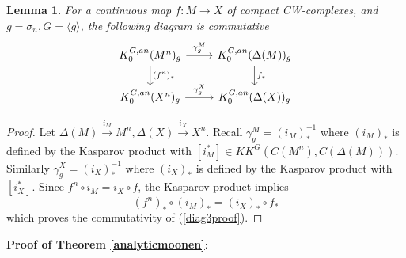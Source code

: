 \documentclass[11pt,leqno,twoside]{amsart}
\theoremstyle{plainsl}
\newtheorem{lemma}[theorem]{Lemma}
\theoremstyle{definition}
\begin{document}
\begin{lemma}\label{functoriallocalization} 
    For a continuous map $f:M\rightarrow X$  of compact CW-complexes, and $g=\sigma_n , G=\langle g\rangle$, the following diagram is commutative
\begin{equation}\label{diag3proof}
    \begin{tikzcd}
     K^{G,an}_0(M^n)_{g}  \arrow[r,  "\gamma^M_{g}"] \arrow[d,  "(f^n)_*"]& K^{G,an}_0(\Delta(M))_{g} \arrow[d,  "f_*"]   \\
K^{G,an}_0(X^n)_{g} \arrow[r,  "\gamma^X_{g}"] & K^{G,an}_0(\Delta(X))_{g}
     \end{tikzcd}
\end{equation}
\end{lemma}
\begin{proof}
Let  $\Delta(M)\xrightarrow{i_M}M^n, \Delta(X)\xrightarrow{i_X}X^n$. Recall 
$\gamma^M_g=(i_{M})_*^{-1}$ where $(i_{M})_*$ is defined by the Kasparov product with
$[i^*_M]\in KK^G(C(M^n),C(\Delta(M)))$. Similarly $\gamma^X_g=(i_{X})_*^{-1}$  where $(i_{X})_*$  is defined by  the Kasparov product with $[i^*_X]$.  Since $f^n\circ i_M=i_X \circ f$, the Kasparov product implies
\begin{equation}\label{kasppush}
    (f^n)_*\circ (i_{M})_*= (i_{X})_*\circ f_*
\end{equation}
which proves the commutativity of (\ref{diag3proof}).
\end{proof}



\textbf{Proof of Theorem \ref{analyticmoonen}}:
\end{document}
